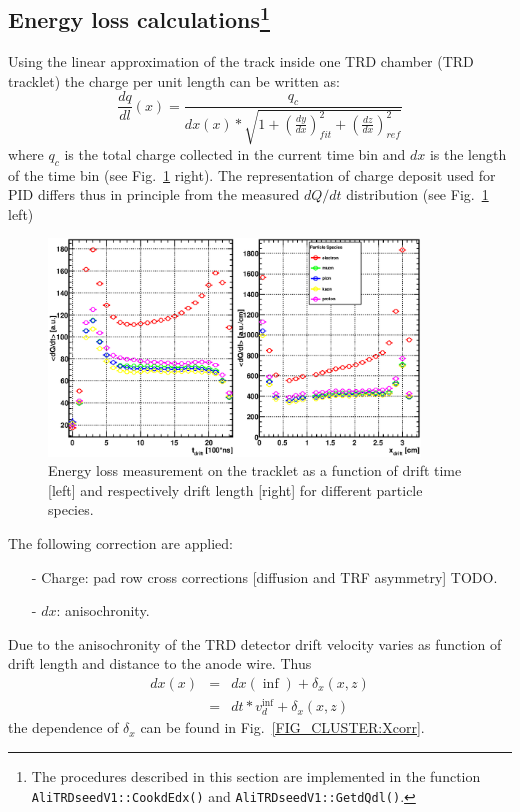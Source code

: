 \documentclass{alicetdr}
\begin{document}
\subsection[Tracklet dE/dx]{Energy loss calculations\footnote{The procedures
described in this section are implemented in the function
{\tt AliTRDseedV1::CookdEdx()} and
{\tt AliTRDseedV1::GetdQdl()}.}}\label{REC:Tracking:TrackletdEdx}

Using the linear approximation of the track inside one TRD chamber (TRD tracklet)
the charge per unit length can be written as:
\begin{equation}
\frac{dq}{dl}(x) = \frac{q_{c}}{dx(x)
                 * \sqrt{1 + (\frac{dy}{dx})^{2}_{fit} + (\frac{dz}{dx})^{2}_{ref}}}
\end{equation}
where $q_c$ is the total charge collected in the current time bin and $dx$ is the length
of the time bin (see Fig.~\ref{FIG_TRACKLET:dEdx} right). The representation of charge
deposit used for PID differs thus in principle from the measured $dQ/dt$ distribution
(see Fig.~\ref{FIG_TRACKLET:dEdx} left)
\begin{figure}[htb]
\begin{center}
\includegraphics[width=0.88\textwidth, height=0.45\textwidth]{plots/trackletDQDT.eps}
\end{center}
\caption{
Energy loss measurement on the tracklet as a function of drift time [left] and
respectively drift length [right] for different particle species.}
\label{FIG_TRACKLET:dEdx}
\end{figure}
The following correction are applied:
\begin{itemize}
\item[-] Charge: pad row cross corrections [diffusion and TRF asymmetry] TODO.
\item[-] $dx$: anisochronity.
\end{itemize}
Due to the anisochronity of the TRD detector drift velocity varies as function of
drift length and distance to the anode wire. Thus
\begin{eqnarray}
dx(x) &=& dx(\inf) + \delta_x(x,z)\\
      &=& dt*v_d^{\inf} + \delta_x(x,z)
\end{eqnarray}
the dependence of $\delta_x$ can be found in Fig.~\ref{FIG_CLUSTER:Xcorr}.
\end{document}
